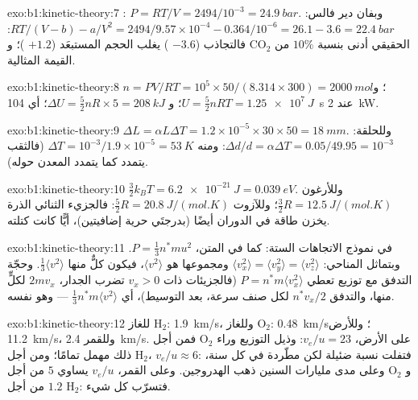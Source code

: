 \begin{solution}{exo:b1:kinetic-theory:7}
: $P = RT/V = 2494/10^{-3} = \qty{24.9}{bar}$. وبفان دير فالس:
$RT/(V - b) - a/V^2 = 2494/9.57\times10^{-4} - 0.364/10^{-6} = 26.1 - 3.6 =
\qty{22.4}{bar}$: فالتجاذب ($-3.6$ ) يغلب الحجم
المستبعَد ($+1.2$ )؛ و CO$_2$ الحقيقي أدنى بنسبة $10\%$ من القيمة المثالية.
\end{solution}

\begin{solution}{exo:b1:kinetic-theory:8}
$n = PV/RT = 10^5 \times 50/(8.314 \times 300) = \qty{2000}{mol}$؛ و $U = \tfrac52
nRT = \qty{1.25e7}{J}$؛ و $\Delta U = \tfrac52 nR \times 5 = \qty{208}{kJ}$؛
أي \qty{104}{s} عند \qty{2}{kW}.
\end{solution}

\begin{solution}{exo:b1:kinetic-theory:9}
$\Delta L = \alpha L\Delta T = 1.2\times10^{-5} \times 30 \times 50 = \qty{18}{mm}$.
وللحلقة: $\Delta d/d = \alpha\Delta T = 0.05/49.95 = 10^{-3}$: ومنه $\Delta T = 10^{-3}/
1.9\times10^{-5} = \qty{53}{K}$ (فالثقب يتمدد كما يتمدد المعدن حوله).
\end{solution}

\begin{solution}{exo:b1:kinetic-theory:10}
$\tfrac32 k_BT = \qty{6.2e-21}{J} = \qty{0.039}{eV}$. وللأرغون $\tfrac32 R =
\qty{12.5}{J/(mol.K)}$؛ وللآزوت $\tfrac52 R = \qty{20.8}{J/(mol.K)}$: فالجزيء
الثنائي الذرة يخزن طاقة في الدوران أيضًا (بدرجتَي حرية
إضافيتين)، أيًّا كانت كتلته.
\end{solution}

\begin{solution}{exo:b1:kinetic-theory:11}
في نموذج الاتجاهات الستة: كما في المتن، $P = \tfrac13 n^*mu^2$. وبتماثل المناحي:
$\langle v_x^2\rangle = \langle v_y^2\rangle = \langle v_z^2\rangle$ ومجموعها
هو $\langle v^2\rangle$، فيكون كلٌّ منها $\tfrac13\langle v^2\rangle$. وحجّة التدفق
مع توزيع تعطي $P = n^*m\langle v_x^2\rangle$ (فالجزيئات
ذات $v_x > 0$ تضرب الجدار،  $2mv_x$ لكلٍّ منها، والتدفق $n^*v_x/2$ لكل
صنف سرعة، بعد التوسيط)، أي $\tfrac13 n^*m\langle v^2\rangle$ --- وهو نفسه.
\end{solution}

\begin{solution}{exo:b1:kinetic-theory:12}
للغاز H$_2$: \qty{1.9}{km/s}، وللغاز O$_2$: \qty{0.48}{km/s}؛ وللأرض \qty{11.2}{km/s}، وللقمر
\qty{2.4}{km/s}. فمن أجل O$_2$ على الأرض، $v_e/u = 23$: وذيل
التوزيع وراء ذلك مهمل تمامًا؛ ومن أجل H$_2$، $v_e/u \approx 6$:
فتفلت نسبة ضئيلة لكن مطّردة في كل سنة، وعلى مدى مليارات
السنين ذهب الهدروجين. وعلى القمر، $v_e/u$ يساوي $5$ من أجل O$_2$ و
$1.2$ من أجل H$_2$: فتسرّب كل شيء.
\end{solution}

